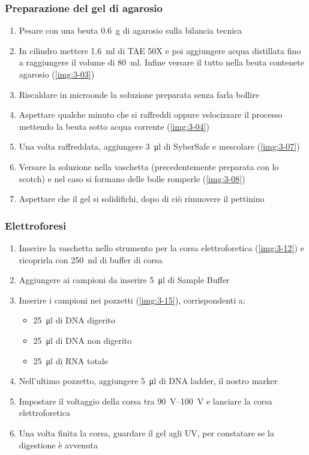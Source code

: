 \subsubsection{Preparazione del gel di agarosio}\label{sssec:agarosio}
\begin{enumerate}
	\item Pesare con una beuta \qty{0.6}{\g} di agarosio sulla bilancia tecnica
	\item In cilindro mettere \qty{1.6}{\ml} di TAE 50X e poi aggiungere acqua distillata fino a raggiungere il volume di \qty{80}{\ml}. Infine versare il tutto nella beuta contenete agarosio (\autoref{img:3-03})
	\item Riscaldare in microonde la soluzione preparata senza farla bollire
	\item Aspettare qualche minuto che si raffreddi oppure velocizzare il processo mettendo la beuta sotto acqua corrente (\autoref{img:3-04})
	\item Una volta raffreddata, aggiungere \qty{3}{\micro\litre} di SyberSafe e mescolare (\autoref{img:3-07})
	\item Versare la soluzione nella vaschetta (precedentemente preparata con lo scotch) e nel caso si formano delle bolle romperle (\autoref{img:3-08})
	\item Aspettare che il gel si solidifichi, dopo di ciò rimuovere il pettinino
\end{enumerate}

\subsubsection{Elettroforesi}
\begin{enumerate}
	\item Inserire la vaschetta nello strumento per la corsa elettroforetica (\autoref{img:3-12}) e ricoprirla con \qty{250}{\ml} di buffer di corsa
	\item Aggiungere ai campioni da inserire \qty{5}{\micro\litre} di \foreignlanguage{english}{Sample Buffer}
	\item Inserire i campioni nei pozzetti (\autoref{img:3-15}), corrispondenti a:
	      \begin{itemize}
		      \item \qty{25}{\micro\litre} di DNA digerito
		      \item \qty{25}{\micro\litre} di DNA non digerito
		      \item \qty{25}{\micro\litre} di RNA totale
	      \end{itemize}
	\item Nell'ultimo pozzetto, aggiungere \qty{5}{\micro\litre} di DNA \foreignlanguage{english}{ladder}, il nostro marker
	\item Impostare il voltaggio della corsa tra \qtyrange{90}{100}{\volt} e lanciare la corsa elettroforetica
	\item Una volta finita la corsa, guardare il gel agli UV, per constatare se la digestione è avvenuta
\end{enumerate}

